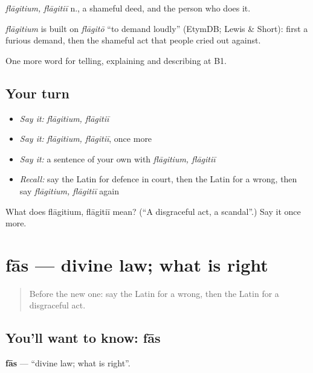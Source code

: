 \emph{flāgitium, flāgitiī} n., a shameful deed, and the person who does it.

\begin{cousinweb}
\emph{flāgitium} is built on \emph{flāgitō} \textquotedblleft{}to demand loudly\textquotedblright{} (EtymDB; Lewis \& Short): first a furious demand, then the shameful act that people cried out against.
\end{cousinweb}

\begin{grammarlens}[title={What you've built}]
One more word for telling, explaining and describing at B1.
\end{grammarlens}

\subsection*{Your turn}
\begin{itemize}
\raggedright
  \item \emph{Say it:} \emph{flāgitium, flāgitiī}
  \item \emph{Say it:} \emph{flāgitium, flāgitiī}, once more
  \item \emph{Say it:} a sentence of your own with \emph{flāgitium, flāgitiī}
  \item \emph{Recall:} say the Latin for defence in court, then the Latin for a wrong, then say \emph{flāgitium, flāgitiī} again
\end{itemize}

\begin{tcolorbox}[breakable,colback=teal!4,colframe=teal!35!black,title={Before you move on}]
What does flāgitium, flāgitiī mean? (\textquotedblleft{}A disgraceful act, a scandal\textquotedblright{}.) Say it once more.
\end{tcolorbox}
\section[fās]{fās — divine law; what is right}

\label{lesson:LA-C414-fas}



\begin{quote}
Before the new one: say the Latin for a wrong, then the Latin for a disgraceful act.
\end{quote}

\subsection*{You'll want to know: fās}
\textbf{fās} — \textquotedblleft{}divine law; what is right\textquotedblright{}.

